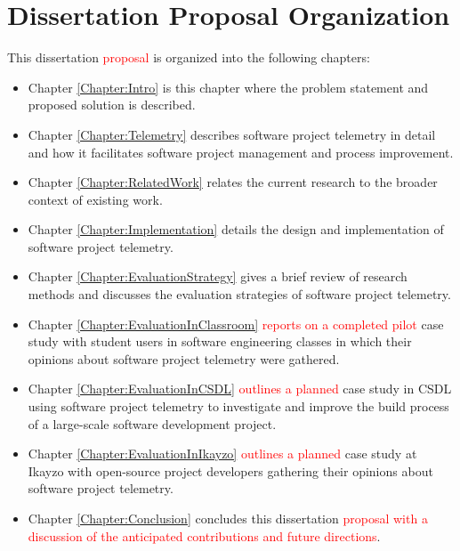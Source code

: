 \section{Dissertation Proposal Organization}  \label{Intro:Organization}

This dissertation \textcolor{red}{proposal} is organized into the following chapters:

\begin{itemize}
  \item {Chapter \ref{Chapter:Intro}} is this chapter where the problem statement and proposed solution is described.
  
  \item {Chapter \ref{Chapter:Telemetry}} describes software project telemetry in detail and how it facilitates software project management and process improvement.

  \item {Chapter \ref{Chapter:RelatedWork}} relates the current research to the broader context of existing work.
        
  \item {Chapter \ref{Chapter:Implementation}} details the design and implementation of software project telemetry.

  \item {Chapter \ref{Chapter:EvaluationStrategy}} gives a brief review of research methods and discusses the evaluation strategies of software project telemetry.
  
  \item {Chapter \ref{Chapter:EvaluationInClassroom}} \textcolor{red}{reports on a completed pilot} case study with student users in software engineering classes in which their opinions about software project telemetry were gathered.
  
  \item {Chapter \ref{Chapter:EvaluationInCSDL}} \textcolor{red}{outlines a planned} case study in CSDL using software project telemetry to investigate and improve the build process of a large-scale software development project.
 
  \item {Chapter \ref{Chapter:EvaluationInIkayzo}} \textcolor{red}{outlines a planned} case study at Ikayzo with open-source project developers gathering their opinions about software project telemetry.
 
  \item {Chapter \ref{Chapter:Conclusion}} concludes this dissertation
        \textcolor{red}{proposal with a discussion of the anticipated contributions and future directions}.
\end{itemize}


